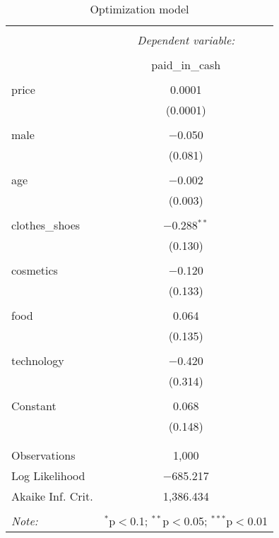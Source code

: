 \begin{table}[!htbp] \centering 
  \caption{Optimization model} 
  \label{} 
\begin{tabular}{@{\extracolsep{5pt}}lc} 
\\[-1.8ex]\hline 
\hline \\[-1.8ex] 
 & \multicolumn{1}{c}{\textit{Dependent variable:}} \\ 
\cline{2-2} 
\\[-1.8ex] & paid\_in\_cash \\ 
\hline \\[-1.8ex] 
 price & 0.0001 \\ 
  & (0.0001) \\ 
  & \\ 
 male & $-$0.050 \\ 
  & (0.081) \\ 
  & \\ 
 age & $-$0.002 \\ 
  & (0.003) \\ 
  & \\ 
 clothes\_shoes & $-$0.288$^{**}$ \\ 
  & (0.130) \\ 
  & \\ 
 cosmetics & $-$0.120 \\ 
  & (0.133) \\ 
  & \\ 
 food & 0.064 \\ 
  & (0.135) \\ 
  & \\ 
 technology & $-$0.420 \\ 
  & (0.314) \\ 
  & \\ 
 Constant & 0.068 \\ 
  & (0.148) \\ 
  & \\ 
\hline \\[-1.8ex] 
Observations & 1,000 \\ 
Log Likelihood & $-$685.217 \\ 
Akaike Inf. Crit. & 1,386.434 \\ 
\hline 
\hline \\[-1.8ex] 
\textit{Note:}  & \multicolumn{1}{r}{$^{*}$p$<$0.1; $^{**}$p$<$0.05; $^{***}$p$<$0.01} \\ 
\end{tabular} 
\end{table} 
